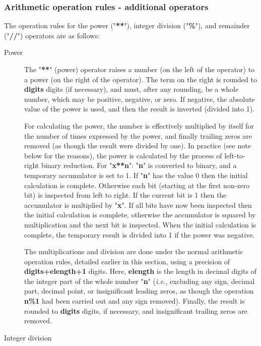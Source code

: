 \subsubsection{Arithmetic operation rules - additional operators}
 The operation rules for the power ("\textbf{**}"),
integer division ("\textbf{\%}"), and remainder
("\textbf{//}") operators are as follows:
\begin{description}
\item[Power]\label{refpower}

The "\textbf{**}" (power) operator raises a number (on the
left of the operator) to a power (on the right of the operator).
The term on the right is rounded to \textbf{digits} digits (if
necessary), and must, after any rounding, be a whole number, which may
be positive, negative, or zero.
If negative, the absolute value of the power is used, and then the
result is inverted (divided into 1).
 
For calculating the power, the number is effectively multiplied by
itself for the number of times expressed by the power, and finally
trailing zeros are removed (as though the result were divided by one).
 In practice (see note below for the reasons), the power is
calculated by the process of left-to-right binary reduction.
For "\textbf{x**n}": "\textbf{n}" is converted to
binary, and a temporary accumulator is set to 1.
If "\textbf{n}" has the value 0 then the initial calculation is
complete.
Otherwise each bit (starting at the first non-zero bit) is inspected
from left to right.
If the current bit is 1 then the accumulator is multiplied by
"\textbf{x}".
If all bits have now been inspected then the initial calculation is
complete, otherwise the accumulator is squared by multiplication and the
next bit is inspected.
When the initial calculation is complete, the temporary result is
divided into 1 if the power was negative.
 
The multiplications and division are done under the normal
arithmetic operation rules, detailed earlier in this section, using a
precision of \textbf{digits+elength+1} digits.
Here, \textbf{elength} is the length in decimal digits of the integer
part of the whole number "\textbf{n}" (\emph{i.e.}, excluding any sign,
decimal part, decimal point, or insignificant leading zeros, as though
the operation \textbf{n\%1} had been carried out and any sign removed).
Finally, the result is rounded to \textbf{digits} digits, if
necessary, and insignificant trailing zeros are removed.
\item[Integer division]


\end{description}
